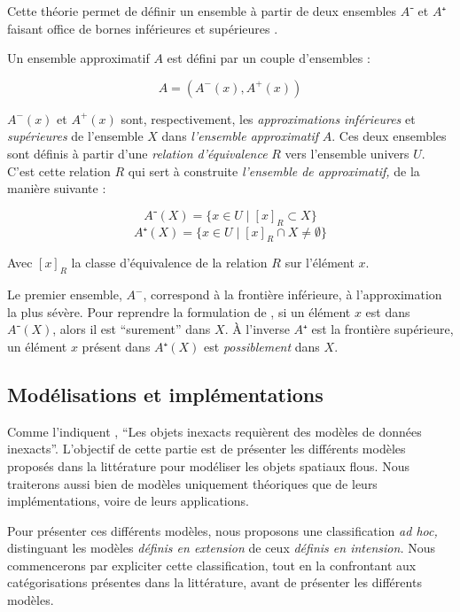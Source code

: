 Cette théorie permet de définir un ensemble à partir de deux ensembles
$A⁻$ et $A⁺$ faisant office de bornes inférieures et supérieures
\autocite{Gacogne1997}.

Un ensemble approximatif $A$ est défini par un couple d'ensembles :

\begin{equation}
  A = (A^-(x),A^+(x))  
\end{equation}

$A^-(x)$ et $A^+(x)$ sont, respectivement, les \emph{approximations}
\emph{inférieures} et \emph{supérieures} de l'ensemble $X$ dans
\emph{l'ensemble approximatif} $A$. Ces deux ensembles sont définis à
partir d'une \emph{relation d'équivalence} $R$ vers l'ensemble univers
$U$. C'est cette relation $R$ qui sert à construite \emph{l'ensemble
  de approximatif,} de la manière suivante :

\begin{equation}
  A⁻(X) = \{ x ∈ U ∣ [x]_R ⊂ X \}
\end{equation}
%
\begin{equation}
  A⁺(X) = \{ x ∈ U ∣ [x]_R ∩ X ≠ ∅ \}
\end{equation}

Avec $[x]_R$ la classe d'équivalence de la relation $R$ sur l'élément
$x$.

Le premier ensemble, $A^-$, correspond à la frontière inférieure, à
l'approximation la plus sévère. Pour reprendre la formulation de
\textcite{Pawlak1982}, si un élément $x$ est dans $A⁻(X)$, alors il
est \enquote{surement} dans $X$. À l'inverse $A⁺$ est la frontière
supérieure, un élément $x$ présent dans $A⁺(X)$ est
\emph{possiblement} dans $X$.


\subsection{Modélisations et implémentations}

Comme l’indiquent \textcite[15]{Burrough1996}, \enquote{Les objets
  inexacts requièrent des modèles de données inexacts}. L’objectif de
cette partie est de présenter les différents modèles proposés dans la
littérature pour modéliser les objets spatiaux flous. Nous traiterons
aussi bien de modèles uniquement théoriques que de leurs
implémentations, voire de leurs applications.

Pour présenter ces différents modèles, nous proposons une
classification \emph{ad hoc,} distinguant les modèles \emph{définis en
  extension} de ceux \emph{définis en intension.} Nous commencerons
par expliciter cette classification, tout en la confrontant aux
catégorisations présentes dans la littérature, avant de présenter les
différents modèles.


